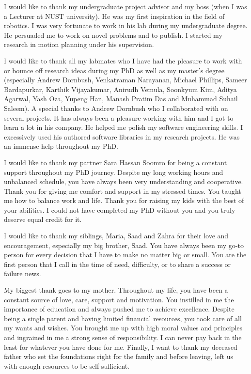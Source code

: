 \documentclass[a4paper]{report}
\begin{document}
I would like to thank my undergraduate project advisor and my boss (when I was a Lecturer at NUST university). He was my first inspiration in the field of robotics. I was very fortunate to work in his lab during my undergraduate degree. He persuaded me to work on novel problems and to publish.
I started my research in motion planning under his supervision.


I would like to thank all my labmates who I have had the pleasure to work with or bounce off research ideas during my PhD as well as my master’s degree (especially Andrew Dornbush, Venkatraman Narayanan, Michael Phillips, Sameer Bardapurkar, Karthik Vijayakumar, Anirudh Vemula, Soonkyum Kim, Aditya Agarwal, Yash Oza, Yupeng Han, Manash Pratim Das and Muhammad Suhail Saleem). A special thanks to Andrew Dornbush who I collaborated with on several projects. It has always been a pleasure working with him and I got to learn a lot in his company. He helped me polish my software engineering skills. I excessively used his authored software libraries in my research projects. He was an immense help throughout my PhD.

I would like to thank my partner Sara Hassan Soomro for being a constant support throughout my PhD journey. Despite my long working hours and unbalanced schedule, you have always been very understanding and cooperative. Thank you for giving me comfort and support in my stressed times. You taught me how to balance work and life. Thank you for raising my kids with the best of your abilities. I could not have completed my PhD without you and you truly deserve equal credit for it.

I would like to thank my siblings, Maria, Saad and Zahra for their love and encouragement, especially my big brother, Saad. You have always been my go-to person for every decision that I have to make no matter big or small. You are the first person that I call in the time of need, difficulty, or to share a success or failure news. 

My biggest thank goes to my mother. Throughout my life, you have been a constant source of love, care, support and motivation. You instilled in me the importance of education and always pushed me to achieve excellence. Despite being a single parent and having limited financial resources, you took care of all my wants and wishes. You brought me up with high moral values and principles and ingrained in me a strong sense of responsibility. I can never pay back in the least for whatever you have done for me. Finally, I want to thank my deceased father who set the foundations right for the family and before leaving, left us with enough resources to be self-sufficient.
\end{document}
